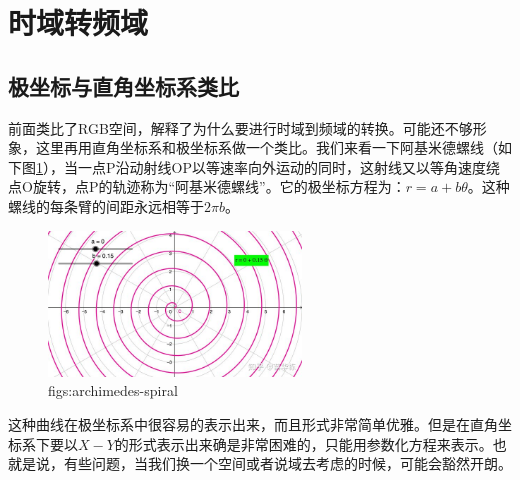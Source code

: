 \documentclass[lang=cn,11pt,a4paper,cite=numbers]{elegantpaper}
\begin{document}
\section{时域转频域}
\subsection{极坐标与直角坐标系类比}
  前面类比了RGB空间，解释了为什么要进行时域到频域的转换。可能还不够形象，这里再用直角坐标系和极坐标系做一个类比。我们来看一下阿基米德螺线（如下图\ref{figs:archimedes-spiral}），当一点P沿动射线OP以等速率向外运动的同时，这射线又以等角速度绕点O旋转，点P的轨迹称为“阿基米德螺线”。它的极坐标方程为：$r=a+b\theta$。这种螺线的每条臂的间距永远相等于$2{\pi}b$。
\begin{figure}[!htb]
  \centering
  \includegraphics[width=0.6\textwidth]{figs/archimedes-spiral.png}
  \caption{figs:archimedes-spiral}
  \label{figs:archimedes-spiral}
\end{figure}

  这种曲线在极坐标系中很容易的表示出来，而且形式非常简单优雅。但是在直角坐标系下要以$X-Y$的形式表示出来确是非常困难的，只能用参数化方程来表示。也就是说，有些问题，当我们换一个空间或者说域去考虑的时候，可能会豁然开朗。
\end{document}
